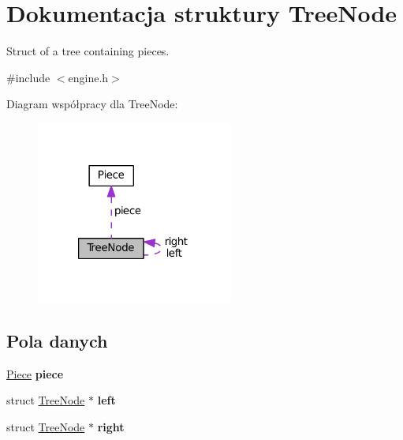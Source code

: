 \hypertarget{structTreeNode}{\section{Dokumentacja struktury Tree\-Node}
\label{structTreeNode}
}


Struct of a tree containing pieces.  




{\ttfamily \#include $<$engine.\-h$>$}



Diagram współpracy dla Tree\-Node\-:\nopagebreak
\begin{figure}[H]
\begin{center}
\leavevmode
\includegraphics[width=184pt]{structTreeNode__coll__graph}
\end{center}
\end{figure}
\subsection*{Pola danych}
\begin{DoxyCompactItemize}
\item 
\hypertarget{structTreeNode_a3f2ec1b7aceb98384fe5a2096b63617f}{\hyperlink{structPiece}{Piece} {\bfseries piece}}\label{structTreeNode_a3f2ec1b7aceb98384fe5a2096b63617f}

\item 
\hypertarget{structTreeNode_a5f0c005596de788acf63ca53e1b2897e}{struct \hyperlink{structTreeNode}{Tree\-Node} $\ast$ {\bfseries left}}\label{structTreeNode_a5f0c005596de788acf63ca53e1b2897e}

\item 
\hypertarget{structTreeNode_ab36f951b4d3d53dfc2d345978900c6e2}{struct \hyperlink{structTreeNode}{Tree\-Node} $\ast$ {\bfseries right}}\label{structTreeNode_ab36f951b4d3d53dfc2d345978900c6e2}

\end{DoxyCompactItemize}


